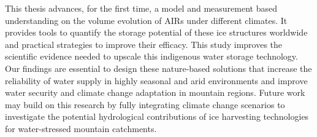 This thesis advances, for the first time, a model and measurement based understanding on the volume evolution of AIRs under different climates. It
provides tools to quantify the storage potential of these ice structures worldwide and practical strategies to
improve their efficacy. This study improves the scientific evidence needed to upscale this indigenous water
storage technology. Our findings are essential to design these nature-based solutions that increase the
reliability of water supply in highly seasonal and arid environments and improve water security and climate
change adaptation in mountain regions. Future work may build on this research by fully integrating climate
change scenarios to investigate the potential hydrological contributions of ice harvesting technologies for
water-stressed mountain catchments.
